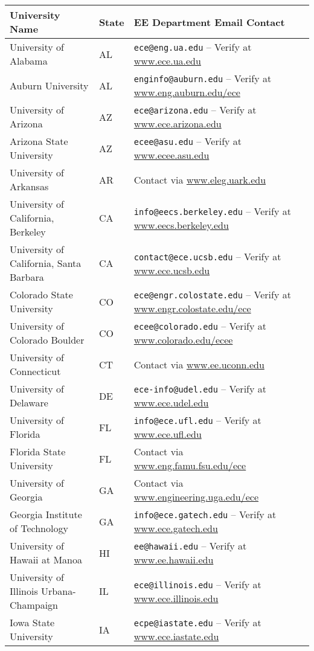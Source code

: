 \documentclass[12pt]{article}
\begin{document}
\begin{longtable}{p{} p{1cm} p{} p{0mm}}
\toprule
\textbf{University Name} & \textbf{State} & \textbf{EE Department Email Contact} \\
\cline{1-3}
\endhead
University of Alabama & AL & \texttt{ece@eng.ua.edu} – Verify at \url{www.ece.ua.edu} \\
Auburn University & AL & \texttt{enginfo@auburn.edu} – Verify at \url{www.eng.auburn.edu/ece} \\
University of Arizona & AZ & \texttt{ece@arizona.edu} – Verify at \url{www.ece.arizona.edu} \\
Arizona State University & AZ & \texttt{ecee@asu.edu} – Verify at \url{www.ecee.asu.edu} \\
University of Arkansas & AR & Contact via \url{www.eleg.uark.edu} \\
University of California, Berkeley & CA & \texttt{info@eecs.berkeley.edu} – Verify at \url{www.eecs.berkeley.edu} \\
University of California, Santa Barbara & CA & \texttt{contact@ece.ucsb.edu} – Verify at \url{www.ece.ucsb.edu} \\
Colorado State University & CO & \texttt{ece@engr.colostate.edu} – Verify at \url{www.engr.colostate.edu/ece} \\
University of Colorado Boulder & CO & \texttt{ecee@colorado.edu} – Verify at \url{www.colorado.edu/ecee} \\
University of Connecticut & CT & Contact via \url{www.ee.uconn.edu} \\
University of Delaware & DE & \texttt{ece-info@udel.edu} – Verify at \url{www.ece.udel.edu} \\
University of Florida & FL & \texttt{info@ece.ufl.edu} – Verify at \url{www.ece.ufl.edu} \\
Florida State University & FL & Contact via \url{www.eng.famu.fsu.edu/ece} \\
University of Georgia & GA & Contact via \url{www.engineering.uga.edu/ece} \\
Georgia Institute of Technology & GA & \texttt{info@ece.gatech.edu} – Verify at \url{www.ece.gatech.edu} \\
University of Hawaii at Manoa & HI & \texttt{ee@hawaii.edu} – Verify at \url{www.ee.hawaii.edu} \\
University of Illinois Urbana-Champaign & IL & \texttt{ece@illinois.edu} – Verify at \url{www.ece.illinois.edu} \\
Iowa State University & IA & \texttt{ecpe@iastate.edu} – Verify at \url{www.ece.iastate.edu} \\

\end{longtable}
\end{document}
